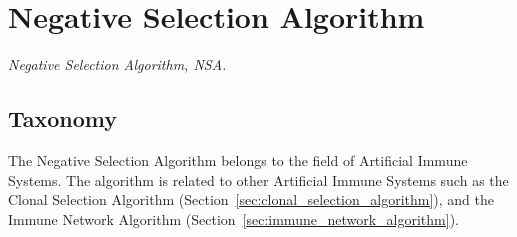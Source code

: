 

\section{Negative Selection Algorithm} 
\label{sec:negative_selection_algorithm}

\emph{Negative Selection Algorithm, NSA.}

\subsection{Taxonomy}
The Negative Selection Algorithm belongs to the field of Artificial Immune Systems.
The algorithm is related to other Artificial Immune Systems such as the Clonal Selection Algorithm (Section~\ref{sec:clonal_selection_algorithm}), and the Immune Network Algorithm (Section~\ref{sec:immune_network_algorithm}).

